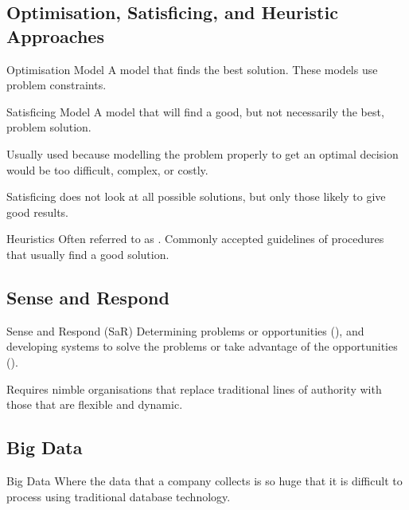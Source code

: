 \documentclass[\main/notes.tex]{subfiles}
\begin{document}
			\subsection{Optimisation, Satisficing, and Heuristic Approaches}
				\begin{definition}{Optimisation Model}
					A model that finds the best solution. These models use problem constraints.
				\end{definition}
				\begin{definition}{Satisficing Model}
					A model that will find a good, but not necessarily the best, problem solution.

					Usually used because modelling the problem properly to get an optimal decision would be too difficult, complex, or costly.

					Satisficing does not look at all possible solutions, but only those likely to give good results.
				\end{definition}
				\begin{definition}{Heuristics}
					Often referred to as . Commonly accepted guidelines of procedures that usually find a good solution.
				\end{definition}
			\subsection{Sense and Respond}
				\begin{definition}{Sense and Respond (SaR)}
					Determining problems or opportunities (), and developing systems to solve the problems or take advantage of the opportunities ().

					Requires nimble organisations that replace traditional lines of authority with those that are flexible and dynamic.
				\end{definition}
			\subsection{Big Data}
				\begin{definition}{Big Data}
					Where the data that a company collects is so huge that it is difficult to process using traditional database technology.
				\end{definition}
	\vbox{}
\end{document}
